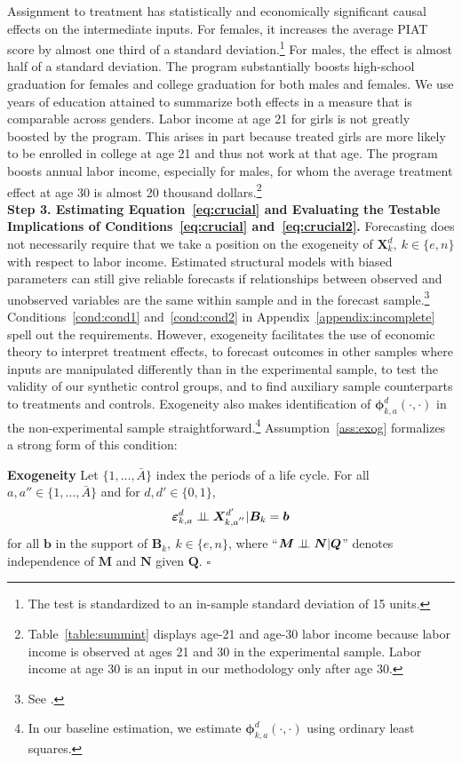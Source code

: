 Assignment to treatment has statistically and economically significant causal effects on the intermediate inputs. For females, it increases the average PIAT score by almost one third of a standard deviation.\footnote{The test is standardized to an in-sample standard deviation of 15 units.} For males, the effect is almost half of a standard deviation. The program substantially boosts high-school graduation for females and college graduation for both males and females. We use years of education attained to summarize both effects in a measure that is comparable across genders. Labor income at age 21 for girls is not greatly boosted by the program. This arises in part because treated girls are more likely to be enrolled in college at age 21 and thus not work at that age. The program boosts annual labor income, especially for males, for whom the average treatment effect at age 30 is almost 20 thousand dollars.\footnote{Table~\ref{table:summint} displays age-21 and age-30 labor income because labor income is observed at ages 21 and 30 in the experimental sample. Labor income at age 30 is an input in our methodology only after age 30.}\\

\textbf{Step 3. Estimating Equation~\eqref{eq:crucial} and Evaluating the Testable Implications of Conditions~\eqref{eq:crucial} and~\eqref{eq:crucial2}.} Forecasting does not necessarily require that we take a position on the exogeneity of $\bm{X}^d_k, \: k \in \{e,n\}$ with respect to labor income. Estimated structural models with biased parameters can still give reliable forecasts if relationships between observed and unobserved variables are the same within sample and in the forecast sample.\footnote{See \cite{Liu-etal-2016-USC-Data-Models}.} Conditions~\ref{cond:cond1} and~\ref{cond:cond2} in Appendix~\ref{appendix:incomplete} spell out the requirements. However, exogeneity facilitates the use of economic theory to interpret treatment effects, to forecast outcomes in other samples where inputs are manipulated differently than in the experimental sample, to test the validity of our synthetic control groups, and to find auxiliary sample counterparts to treatments and controls. Exogeneity also makes identification of $\bm{\phi}^d_{k,a}\left( \cdot, \cdot \right)$ in the non-experimental sample straightforward.\footnote{In our baseline estimation, we estimate $\bm{\phi}^d_{k,a}\left( \cdot, \cdot \right)$ using ordinary least squares.} Assumption~\ref{ass:exog} formalizes a strong form of this condition:

\onehalfspacing
\begin{assumption}\label{ass:exog} \textbf{Exogeneity}
Let $\{ 1, \ldots, \bar{A} \}$ index the periods of a life cycle. For all $a, a'' \in \{ 1, \ldots, \bar{A} \}$ and for $d, d' \in \{0,1\}$,
\begin{equation}
\bm{\varepsilon}^d_{k,a} \perp\!\!\!\perp \bm{X}^{d^{\prime}}_{k,a^{''}} | \bm{B}_k = \bm{b}
\end{equation}
for all $\bm{b}$ in the support of $\bm{B}_k, \: k \in \{e,n\}$, where ``$\bm{M} \perp\!\!\!\perp \bm{N}|\bm{Q}$'' denotes independence of $\bm{M}$ and $\bm{N}$ given $\bm{Q}$. $\square$
\end{assumption}
\doublespacing

